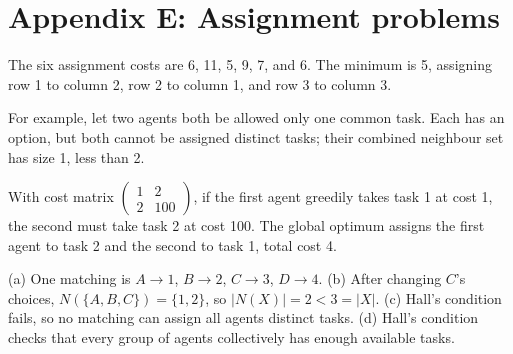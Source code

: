 \section*{Appendix E: Assignment problems}
\begin{description}[style=nextline]
\item[E.1] The six assignment costs are 6, 11, 5, 9, 7, and 6. The minimum is 5, assigning row 1 to column 2, row 2 to column 1, and row 3 to column 3.
\item[E.2] For example, let two agents both be allowed only one common task. Each has an option, but both cannot be assigned distinct tasks; their combined neighbour set has size 1, less than 2.
\item[E.3] With cost matrix $\begin{pmatrix}1&2\\2&100\end{pmatrix}$, if the first agent greedily takes task 1 at cost 1, the second must take task 2 at cost 100. The global optimum assigns the first agent to task 2 and the second to task 1, total cost 4.
\item[E.4] (a) One matching is $A\to1$, $B\to2$, $C\to3$, $D\to4$. (b) After changing $C$'s choices, $N(\{A,B,C\})=\{1,2\}$, so $|N(X)|=2<3=|X|$. (c) Hall's condition fails, so no matching can assign all agents distinct tasks. (d) Hall's condition checks that every group of agents collectively has enough available tasks.
\end{description}